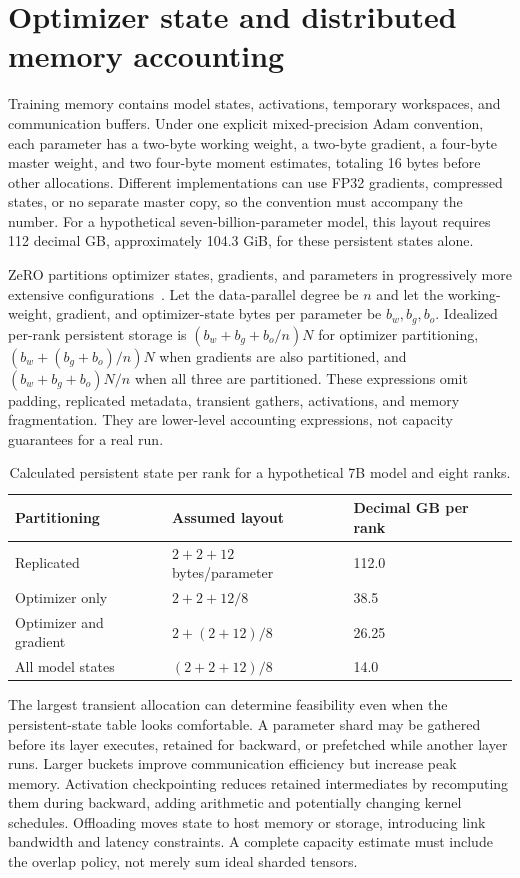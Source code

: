 \section{Optimizer state and distributed memory accounting}
\label{sec:C07:memory}
Training memory contains model states, activations, temporary workspaces, and communication buffers. Under one explicit mixed-precision Adam convention, each parameter has a two-byte working weight, a two-byte gradient, a four-byte master weight, and two four-byte moment estimates, totaling 16 bytes before other allocations. Different implementations can use FP32 gradients, compressed states, or no separate master copy, so the convention must accompany the number. For a hypothetical seven-billion-parameter model, this layout requires 112 decimal GB, approximately 104.3 GiB, for these persistent states alone.

ZeRO partitions optimizer states, gradients, and parameters in progressively more extensive configurations~\cite{rajbhandari2019zero}. Let the data-parallel degree be $n$ and let the working-weight, gradient, and optimizer-state bytes per parameter be $b_w,b_g,b_o$. Idealized per-rank persistent storage is $(b_w+b_g+b_o/n)N$ for optimizer partitioning, $(b_w+(b_g+b_o)/n)N$ when gradients are also partitioned, and $(b_w+b_g+b_o)N/n$ when all three are partitioned. These expressions omit padding, replicated metadata, transient gathers, activations, and memory fragmentation. They are lower-level accounting expressions, not capacity guarantees for a real run.

{\small\setlength{\tabcolsep}{3pt}
\begin{table}[!htbp]
\centering
\caption{Calculated persistent state per rank for a hypothetical 7B model and eight ranks.}\label{tab:C07:states}
\begin{tabular}{L{31mm}L{35mm}L{40mm}}

\toprule Partitioning & Assumed layout & Decimal GB per rank\\\midrule
Replicated & $2+2+12$ bytes/parameter & 112.0\\
Optimizer only & $2+2+12/8$ & 38.5\\
Optimizer and gradient & $2+(2+12)/8$ & 26.25\\
All model states & $(2+2+12)/8$ & 14.0\\
\bottomrule
\end{tabular}
\end{table}
}

The largest transient allocation can determine feasibility even when the persistent-state table looks comfortable. A parameter shard may be gathered before its layer executes, retained for backward, or prefetched while another layer runs. Larger buckets improve communication efficiency but increase peak memory. Activation checkpointing reduces retained intermediates by recomputing them during backward, adding arithmetic and potentially changing kernel schedules. Offloading moves state to host memory or storage, introducing link bandwidth and latency constraints. A complete capacity estimate must include the overlap policy, not merely sum ideal sharded tensors.

